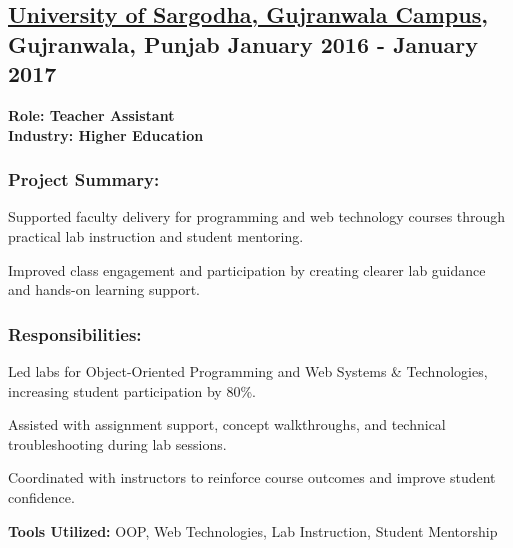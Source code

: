 \subsection{\textbf{\href{https://www.facebook.com/uosgrw.official/}{University of Sargodha, Gujranwala Campus}, Gujranwala, Punjab} \hfill January 2016 - January 2017}
\noindent\textbf{Role: Teacher Assistant}\\
\noindent\textbf{Industry: Higher Education}

\subsubsection*{\textbf{Project Summary:}}
\begin{zitemize}
\item Supported faculty delivery for programming and web technology courses through practical lab instruction and student mentoring.
\item Improved class engagement and participation by creating clearer lab guidance and hands-on learning support.
\end{zitemize}

\subsubsection*{\textbf{Responsibilities:}}
\begin{zitemize}
\item Led labs for Object-Oriented Programming and Web Systems \& Technologies, increasing student participation by 80\%.
\item Assisted with assignment support, concept walkthroughs, and technical troubleshooting during lab sessions.
\item Coordinated with instructors to reinforce course outcomes and improve student confidence.
\end{zitemize}

\noindent\textbf{Tools Utilized:} OOP, Web Technologies, Lab Instruction, Student Mentorship
